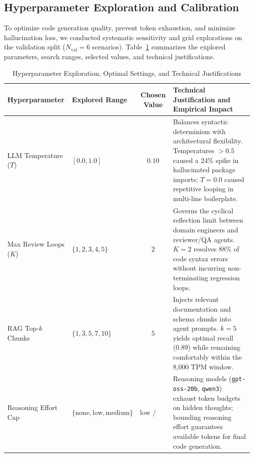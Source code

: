 \documentclass[10pt,journal,compsoc]{IEEEtran}
\begin{document}
\subsection{Hyperparameter Exploration and Calibration}
To optimize code generation quality, prevent token exhaustion, and minimize hallucination loss, we conducted systematic sensitivity and grid explorations on the validation split ($N_{\text{val}} = 6$ scenarios). Table~\ref{tab:hyperparameters} summarizes the explored parameters, search ranges, selected values, and technical justifications.

\begin{table}[t]
\centering
\caption{Hyperparameter Exploration, Optimal Settings, and Technical Justifications}
\label{tab:hyperparameters}
\begin{tabular}{lp{3.2cm}cp{8.2cm}}
\toprule
\textbf{Hyperparameter} & \textbf{Explored Range} & \textbf{Chosen Value} & \textbf{Technical Justification and Empirical Impact} \\
\midrule
LLM Temperature ($T$) & $[0.0, 1.0]$ & $0.10$ & Balances syntactic determinism with architectural flexibility. Temperatures $>0.5$ caused a 24\% spike in hallucinated package imports; $T=0.0$ caused repetitive looping in multi-line boilerplate. \\
\addlinespace
Max Review Loops ($K$) & $\{1, 2, 3, 4, 5\}$ & $2$ & Governs the cyclical reflection limit between domain engineers and reviewer/QA agents. $K=2$ resolves 88\% of code syntax errors without incurring non-terminating regression loops. \\
\addlinespace
RAG Top-$k$ Chunks & $\{1, 3, 5, 7, 10\}$ & $5$ & Injects relevant documentation and schema chunks into agent prompts. $k=5$ yields optimal recall (0.89) while remaining comfortably within the 8,000 TPM window. \\
\addlinespace
Reasoning Effort Cap & $\{\text{none}, \text{low}, \text{medium}\}$ & $\text{low / none}$ & Reasoning models (\texttt{gpt-oss-20b}, \texttt{qwen3}) exhaust token budgets on hidden thoughts; bounding reasoning effort guarantees available tokens for final code generation. \\
\bottomrule
\end{tabular}
\end{table}
\end{document}
